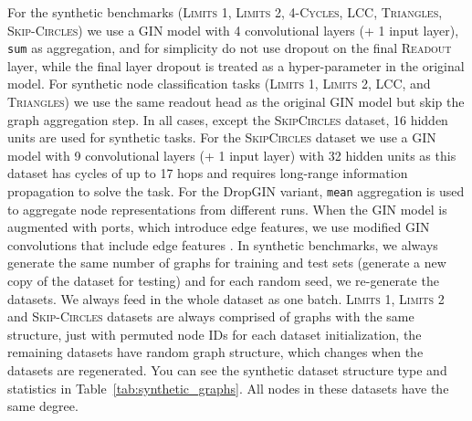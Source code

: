 \documentclass{article}
\begin{document}
For the synthetic benchmarks (\textsc{Limits 1}, \textsc{Limits 2}, \textsc{4-Cycles}, \textsc{LCC}, \textsc{Triangles}, \textsc{Skip-Circles}) we use a GIN model with 4 convolutional layers (+ 1 input layer), \texttt{sum} as aggregation,  and for simplicity do not use dropout on the final \textsc{Readout} layer, while the final layer dropout is treated as a hyper-parameter in the original model. For synthetic node classification tasks (\textsc{Limits 1}, \textsc{Limits 2}, \textsc{LCC}, and \textsc{Triangles}) we use the same readout head as the original GIN model but skip the graph aggregation step. In all cases, except the \textsc{SkipCircles} dataset, 16 hidden units are used for synthetic tasks. For the \textsc{SkipCircles} dataset we use a GIN model with 9 convolutional layers (+ 1 input layer) with 32 hidden units as this dataset has cycles of up to 17 hops and requires long-range information propagation to solve the task. For the DropGIN variant, \texttt{mean} aggregation is used to aggregate node representations from different runs. When the GIN model is augmented with ports, which introduce edge features, we use modified GIN convolutions that include edge features \citep{hu2019strategies}. In synthetic benchmarks, we always generate the same number of graphs for training and test sets (generate a new copy of the dataset for testing) and for each random seed, we re-generate the datasets. We always feed in the whole dataset as one batch. \textsc{Limits 1}, \textsc{Limits 2} and \textsc{Skip-Circles} datasets are always comprised of graphs with the same structure, just with permuted node IDs for each dataset initialization, the remaining datasets have random graph structure, which changes when the datasets are regenerated. You can see the synthetic dataset structure type and statistics in Table~\ref{tab:synthetic_graphs}. All nodes in these datasets have the same degree.
\end{document}
